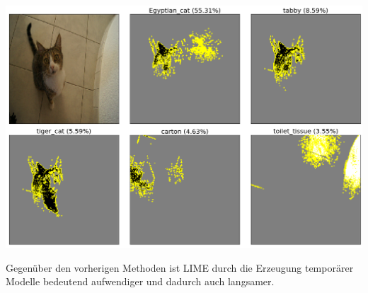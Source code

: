 \documentclass[
  12pt, %
  a4paper, %
  oneside, %
  openany, 
  numbers=noenddot, %
  BCOR=5mm, %
  parskip=half*, %
  thesis, %
]{bfhbook}
\begin{document}
\includegraphics[width=\textwidth]{Bilder/Lime-Classes.png}

Gegenüber den vorherigen Methoden ist LIME durch die Erzeugung temporärer Modelle bedeutend aufwendiger und dadurch auch langsamer.
\end{document}
